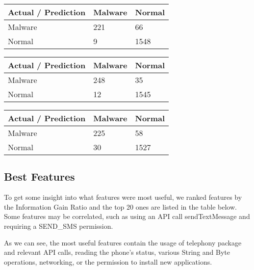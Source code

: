 \begin{tabular}{|l|l l|}
\hline
Actual / Prediction & Malware & Normal \\
\hline
Malware & 221 & 66 \\
Normal & 9 & 1548 \\
\hline
\end{tabular}
\begin{tabular}{|l|l l|}
\hline
Actual / Prediction & Malware & Normal \\
\hline
Malware & 248 & 35 \\
Normal & 12 & 1545 \\
\hline
\end{tabular}
\begin{tabular}{|l|l l|}
\hline
Actual / Prediction & Malware & Normal \\
\hline
Malware & 225 & 58 \\
Normal & 30 & 1527 \\
\hline
\end{tabular}


\subsection{Best Features}
To get some insight into what features were most useful, we ranked features by the Information Gain Ratio and the top 20 ones are listed in the table below. Some features may be correlated, such as using an API call sendTextMessage and requiring a SEND\_SMS permission.

As we can see, the most useful features contain the usage of telephony package and relevant API calls, reading the phone's status, various String and Byte operations, networking, or the permission to install new applications. 

